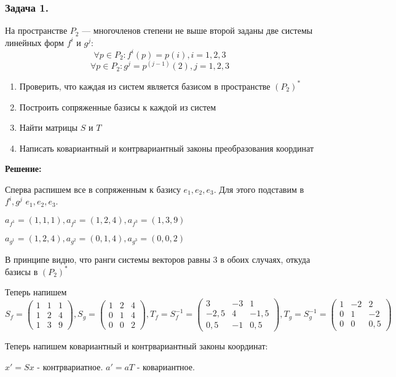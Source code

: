 \subsubsection{Задача 1.}

На пространстве $P_2$ --- многочленов степени не выше второй заданы две системы линейных форм $f^i$ и $g^j$:
$$\forall p \in P_2: f^i(p) = p(i), i=1,2,3$$
$$\forall p \in P_2: g^j = p^{(j-1)}(2), j=1,2,3$$
\begin{enumerate}
    \item Проверить, что каждая из систем является базисом в пространстве $(P_2)^*$
    \item Построить сопряженные базисы к каждой из систем
    \item Найти матрицы $S$ и $T$
    \item Написать ковариантный и контрвариантный законы преобразования координат
\end{enumerate}

\textbf{Решение:}

Сперва распишем все в сопряженным к базису $e_1,e_2,e_3$. Для этого подставим в $f^i,g^j$ $e_1,e_2,e_3$.

$a_{f^1} =(1,1,1), a_{f^2} =(1,2,4), a_{f^3}=(1,3,9)$

$a_{g^1 }= (1,2,4), a_{g^2}=(0,1,4), a_{g^3}= (0,0, 2)$

В принципе видно, что ранги системы векторов равны 3 в обоих случаях, откуда базисы в $(P_2)^*$

Теперь напишем $S_f  = \begin{pmatrix}
    1 & 1 & 1 \\
    1 & 2 & 4 \\
    1 & 3 & 9 
\end{pmatrix}, S_g = \begin{pmatrix}
    1 & 2 & 4 \\
    0 & 1 & 4 \\
    0 & 0 & 2
\end{pmatrix}, T_f = S_f^{-1}=\begin{pmatrix}
    3 & -3 & 1 \\
    -2,5 & 4 & -1,5\\
    0,5 & -1 & 0,5
\end{pmatrix}, T_g = S_g^{-1}=\begin{pmatrix}
    1 & -2 & 2\\
    0 & 1 & -2 \\
    0 & 0 &  0,5
\end{pmatrix}$

Теперь напишем ковариантный и контрвариантный законы координат:

$x' = Sx$ - контрвариатное.
$a' = aT$ - ковариантное.